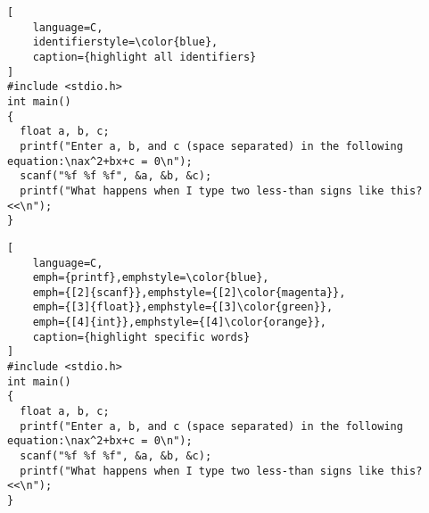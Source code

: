 \documentclass{article}
\begin{document}
\begin{lstlisting}[
	language=C,
	identifierstyle=\color{blue},
	caption={highlight all identifiers}
]
#include <stdio.h>
int main()
{
  float a, b, c;
  printf("Enter a, b, and c (space separated) in the following equation:\nax^2+bx+c = 0\n");
  scanf("%f %f %f", &a, &b, &c);
  printf("What happens when I type two less-than signs like this? <<\n");
}
\end{lstlisting}


\begin{lstlisting}[
	language=C,
	emph={printf},emphstyle=\color{blue},
	emph={[2]{scanf}},emphstyle={[2]\color{magenta}},
	emph={[3]{float}},emphstyle={[3]\color{green}},
	emph={[4]{int}},emphstyle={[4]\color{orange}},
	caption={highlight specific words}
]
#include <stdio.h>
int main()
{
  float a, b, c;
  printf("Enter a, b, and c (space separated) in the following equation:\nax^2+bx+c = 0\n");
  scanf("%f %f %f", &a, &b, &c);
  printf("What happens when I type two less-than signs like this? <<\n");
}
\end{lstlisting}
\end{document}
